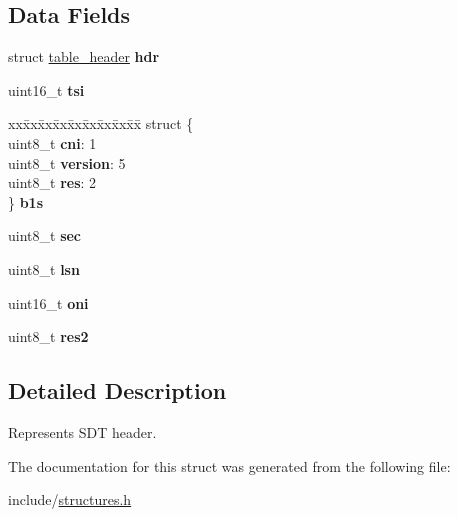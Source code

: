 \subsection*{Data Fields}
\begin{DoxyCompactItemize}
\item 
struct \hyperlink{structtable__header}{table\+\_\+header} {\bfseries hdr}\hypertarget{structsdt__header_a76653d315da95437fbe376d846417a95}{}\label{structsdt__header_a76653d315da95437fbe376d846417a95}

\item 
uint16\+\_\+t {\bfseries tsi}\hypertarget{structsdt__header_a38146283605f14f7ba1fb3ade2c9553e}{}\label{structsdt__header_a38146283605f14f7ba1fb3ade2c9553e}

\item 
\begin{tabbing}
xx\=xx\=xx\=xx\=xx\=xx\=xx\=xx\=xx\=\kill
struct \{\\
\>uint8\_t {\bfseries cni}: 1\\
\>uint8\_t {\bfseries version}: 5\\
\>uint8\_t {\bfseries res}: 2\\
\} {\bfseries b1s}\hypertarget{structsdt__header_a625ba58abca543c0fe8513672258eee0}{}\label{structsdt__header_a625ba58abca543c0fe8513672258eee0}
\\

\end{tabbing}\item 
uint8\+\_\+t {\bfseries sec}\hypertarget{structsdt__header_a660008af823b9b1a74b36315f799fc57}{}\label{structsdt__header_a660008af823b9b1a74b36315f799fc57}

\item 
uint8\+\_\+t {\bfseries lsn}\hypertarget{structsdt__header_a4aeb8ddd115df57e9730ed548bd83ab2}{}\label{structsdt__header_a4aeb8ddd115df57e9730ed548bd83ab2}

\item 
uint16\+\_\+t {\bfseries oni}\hypertarget{structsdt__header_af3410c6d0eafc0c8aed7596323ea4293}{}\label{structsdt__header_af3410c6d0eafc0c8aed7596323ea4293}

\item 
uint8\+\_\+t {\bfseries res2}\hypertarget{structsdt__header_ab183c41ae92058daf90868ffb0495486}{}\label{structsdt__header_ab183c41ae92058daf90868ffb0495486}

\end{DoxyCompactItemize}


\subsection{Detailed Description}
Represents S\+DT header. 

The documentation for this struct was generated from the following file\+:\begin{DoxyCompactItemize}
\item 
include/\hyperlink{structures_8h}{structures.\+h}\end{DoxyCompactItemize}
